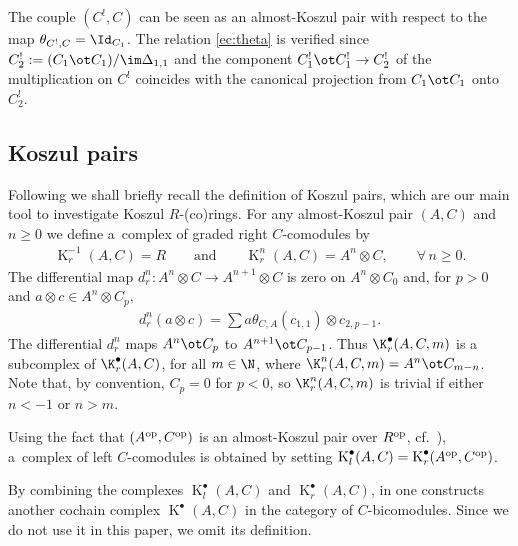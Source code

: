 The couple $(C^!,C)$ can be seen as an almost-Koszul pair with respect to the map $\theta_{C^!,C}=\Id_{ C_1}$. The relation \eqref{ec:theta} is verif\/ied since $C^!_2:=(C_1\ot C_1)/\im\Delta_{1,1}$ and the component $C_1^!\ot C_1^!\to C^!_2$ of the multiplication on $C^!$ coincides with the canonical projection from $C_1\ot C_1$ onto $C^!_2$.

\subsection{Koszul pairs} \label{fa:Koszul pairs}
Following \cite{jps} we shall brief\/ly recall the def\/inition of Koszul pairs, which are our main tool to investigate Koszul $R$-(co)rings. For any almost-Koszul pair $(A,C)$ and $n\geq 0$ we def\/ine a~complex of graded right $C$-comodules by
\begin{gather*} \operatorname{K}_r^{-1}(A,C)=R \qquad \text{and} \qquad \operatorname{K}^n_r(A,C)=A^n \otimes C, \qquad \forall\, n \geq 0.\end{gather*}
The dif\/ferential map $d_{r}^{n}\colon A^{n}\otimes C\rightarrow A^{n+1}\otimes C$ is zero on $A^{n}\otimes C_{0}$ and, for $p>0$ and $a\otimes c\in A^{n}\otimes C_{p},$
\begin{gather*}
 d_{r}^{n}(a\otimes c)=\sum\limits a\theta _{C,A}(c_{1,{1}})\otimes c_{2,{p-1}}.
\end{gather*}
The dif\/ferential $d^n_r$ maps $A^{n}\ot C_{p}$ to $A^{n+1}\ot C_{p-1}$. Thus $\K^\bullet_r(A,C,m)$ is a subcomplex of $\K^\bullet_r(A,C)$, for all $m\in\N$, where $\K^n_r(A,C,m)= A^{n}\ot C_{m-n}$. Note that, by convention, $C_p=0$ for $p<0$, so $\K^n_r(A,C,m)$ is trivial if either $n<-1$ or $n>m$.

Using the fact that $(A^{\rm op},C^{\rm op})$ is an almost-Koszul pair over $R^{\rm op}$, cf.\ \cite[Remark~1.4]{jps}), a~complex of left $C$-comodules is obtained by setting $\operatorname{K}_l^\bullet(A,C)=\operatorname{K}_r^\bullet(A^{\rm op},C^{\rm op})$.

By combining the complexes $\operatorname{K}_l^\bullet(A,C)$ and $\operatorname{K}_r^\bullet(A,C)$, in \cite{jps} one constructs another cochain complex $\operatorname{K}^\bullet(A,C)$ in the category of $C$-bicomodules. Since we do not use it in this paper, we omit its def\/inition.

